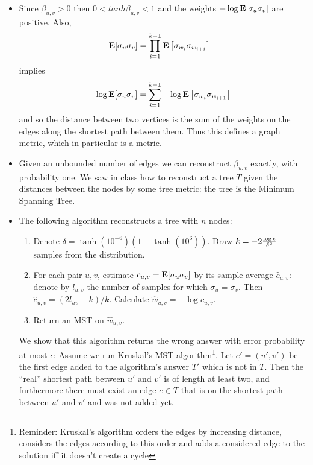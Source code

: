 \documentclass[11pt]{article} \usepackage{amssymb}
\newcommand{\E}{{\bf E}} \newcommand{\Cov}{{\bf Cov}}
\newcommand{\eps}{\epsilon} \newcommand{\lam}{\lambda}
\begin{document}
\begin{itemize}
\item Since $\beta_{u,v}>0$ then $0<tanh\beta_{u,v}<1$ and
  the weights $-\log\E[\sigma_u\sigma_v]$ are positive. Also,
  \begin{align*}
    \E[\sigma_u\sigma_v] &=
    \prod_{i=1}^{k-1}\E\left[\sigma_{w_i}\sigma_{w_{i+1}}\right]
  \end{align*}
  implies
  \begin{align*}
    -\log\E[\sigma_u\sigma_v] &=
    \sum_{i=1}^{k-1}-\log\E\left[\sigma_{w_i}\sigma_{w_{i+1}}\right]
  \end{align*}
  and so the distance between two vertices is the sum of the weights
  on the edges along the shortest path between them. Thus this defines
  a graph metric, which in particular is a metric.
\item Given an unbounded number of edges we can reconstruct
  $\beta_{u,v}$ exactly, with probability one. We saw in class how to
  reconstruct a tree $T$ given the distances between the nodes by some
  tree metric: the tree is the Minimum Spanning Tree.
\item The following algorithm reconstructs a tree with $n$ nodes:
  \begin{enumerate}
  \item Denote $\delta = \tanh(10^{-6})(1-\tanh(10^6))$. Draw
    $k=-2{\log\eps\over \delta^2}$ samples from the distribution.
  \item For each pair $u,v$, estimate $c_{u,v}=\E[\sigma_u\sigma_v]$
    by its sample average $\hat{c}_{u,v}$: denote by $l_{u,v}$ the
    number of samples for which $\sigma_u=\sigma_v$. Then
    $\hat{c}_{u,v}=(2l_{uv}-k)/k$. Calculate $\hat{w}_{u,v}=-\log
    \hat{c}_{u,v}$.
  \item Return an MST on $\hat{w}_{u,v}$. 
  \end{enumerate}
  We show that this algorithm returns the wrong answer with error
  probability at most $\eps$: Assume we run Kruskal's MST
  algorithm\footnote{Reminder: Kruskal's algorithm orders the edges by
    increasing distance, considers the edges according to this order
    and adds a considered edge to the solution iff it doesn't create a
    cycle}. Let $e'=(u',v')$ be the first edge added to the
  algorithm's answer $T'$ which is not in $T$. Then the ``real''
  shortest path between $u'$ and $v'$ is of length at least two, and
  furthermore there must exist an edge $e \in T$ that is on the
  shortest path between $u'$ and $v'$ and was not added yet.


\end{itemize}
\end{document}
